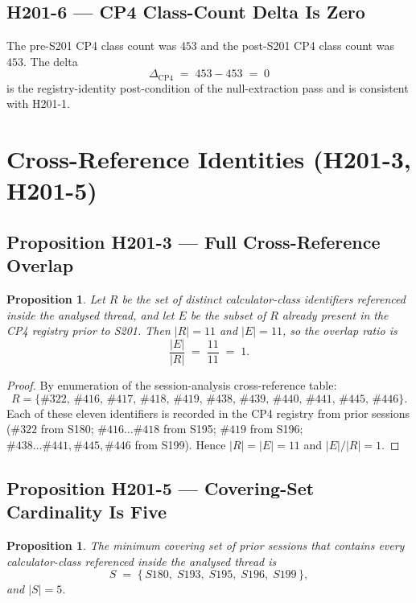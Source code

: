 \documentclass[11pt,letterpaper]{article}
\newtheorem{proposition}[theorem]{Proposition}
\theoremstyle{definition}
\begin{document}
\subsection{H201-6 --- CP4 Class-Count Delta Is Zero}

The pre-S201 CP4 class count was $453$ and the post-S201 CP4 class
count was $453$. The delta
\[
   \Delta_{\mathrm{CP4}} \;=\; 453 - 453 \;=\; 0
\]
is the registry-identity post-condition of the null-extraction pass and
is consistent with H201-1.

\section{Cross-Reference Identities (H201-3, H201-5)}

\subsection{Proposition H201-3 --- Full Cross-Reference Overlap}

\begin{proposition}\label{prop:overlap}
Let $R$ be the set of distinct calculator-class identifiers referenced
inside the analysed thread, and let $E$ be the subset of $R$ already
present in the CP4 registry prior to S201. Then $|R| = 11$ and
$|E| = 11$, so the overlap ratio is
\[
   \frac{|E|}{|R|} \;=\; \frac{11}{11} \;=\; 1.
\]
\end{proposition}

\begin{proof}
By enumeration of the session-analysis cross-reference table:
\[
   R = \{\#322,\, \#416,\, \#417,\, \#418,\, \#419,\, \#438,\, \#439,\, \#440,\, \#441,\, \#445,\, \#446\}.
\]
Each of these eleven identifiers is recorded in the CP4 registry from
prior sessions ($\#322$ from S180; $\#416\ldots\#418$ from S195;
$\#419$ from S196; $\#438\ldots\#441, \#445, \#446$ from S199). Hence
$|R| = |E| = 11$ and $|E|/|R| = 1$.
\end{proof}

\subsection{Proposition H201-5 --- Covering-Set Cardinality Is Five}

\begin{proposition}\label{prop:covering}
The minimum covering set of prior sessions that contains every
calculator-class referenced inside the analysed thread is
\[
   S \;=\; \{\,S180,\; S193,\; S195,\; S196,\; S199\,\},
\]
and $|S| = 5$.
\end{proposition}
\end{document}
